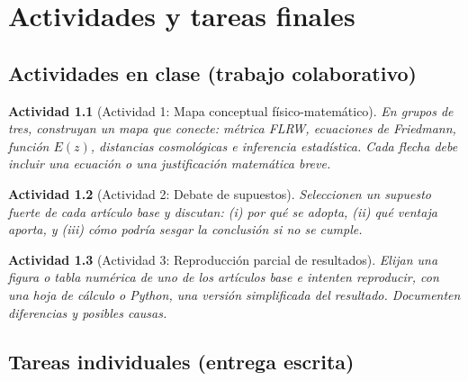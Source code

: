 \documentclass[12pt,oneside]{book}
\newtheorem{actividad}{Actividad}[chapter]
\begin{document}
\chapter{Actividades y tareas finales}

\section{Actividades en clase (trabajo colaborativo)}

\begin{actividad}[Actividad 1: Mapa conceptual físico-matemático]
En grupos de tres, construyan un mapa que conecte: métrica FLRW, ecuaciones de
Friedmann, función $E(z)$, distancias cosmológicas e inferencia estadística. Cada
flecha debe incluir una ecuación o una justificación matemática breve.
\end{actividad}

\begin{actividad}[Actividad 2: Debate de supuestos]
Seleccionen un supuesto fuerte de cada artículo base y discutan: (i) por qué se adopta,
(ii) qué ventaja aporta, y (iii) cómo podría sesgar la conclusión si no se cumple.
\end{actividad}

\begin{actividad}[Actividad 3: Reproducción parcial de resultados]
Elijan una figura o tabla numérica de uno de los artículos base e intenten reproducir,
con una hoja de cálculo o Python, una versión simplificada del resultado.
Documenten diferencias y posibles causas.
\end{actividad}

\section{Tareas individuales (entrega escrita)}
\end{document}
